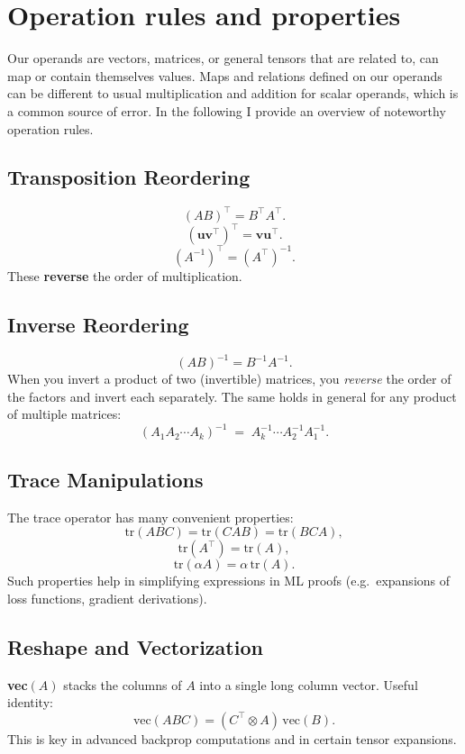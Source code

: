 \section{Operation rules and properties}

Our operands are vectors, matrices, or general tensors that are related to, can map or contain themselves values. Maps and relations defined on our operands can be different to usual multiplication and addition for scalar operands, which is a common source of error. In the following I provide an overview of noteworthy operation rules.

\subsection{Transposition Reordering}
\[
(AB)^\top = B^\top A^\top.
\]
\[
(\mathbf{u} \mathbf{v}^\top)^\top = \mathbf{v} \mathbf{u}^\top.
\]
\[
(A^{-1})^\top = (A^\top)^{-1}.
\]
These \textbf{reverse} the order of multiplication.

\subsection{Inverse Reordering}
\[
(AB)^{-1} = B^{-1} A^{-1}.
\]
When you invert a product of two (invertible) matrices, you \emph{reverse} the order of the factors 
and invert each separately. The same holds in general for any product of multiple matrices:
\[
(A_1 A_2 \cdots A_k)^{-1} \;=\; A_k^{-1} \cdots A_2^{-1} A_1^{-1}.
\]

\subsection{Trace Manipulations}
The trace operator has many convenient properties:
\[
\text{tr}(ABC) = \text{tr}(CAB) = \text{tr}(BCA),
\]
\[
\text{tr}(A^\top) = \text{tr}(A),
\]
\[
\text{tr}(\alpha A) = \alpha \, \text{tr}(A).
\]
Such properties help in simplifying expressions in ML proofs (e.g.\ expansions of 
loss functions, gradient derivations).

\subsection{Reshape and Vectorization}
\textbf{vec}$(A)$ stacks the columns of $A$ into a single long column vector. 
Useful identity:
\[
\text{vec}(ABC) = (C^\top \otimes A)\,\text{vec}(B).
\]
This is key in advanced backprop computations and in certain tensor expansions.


